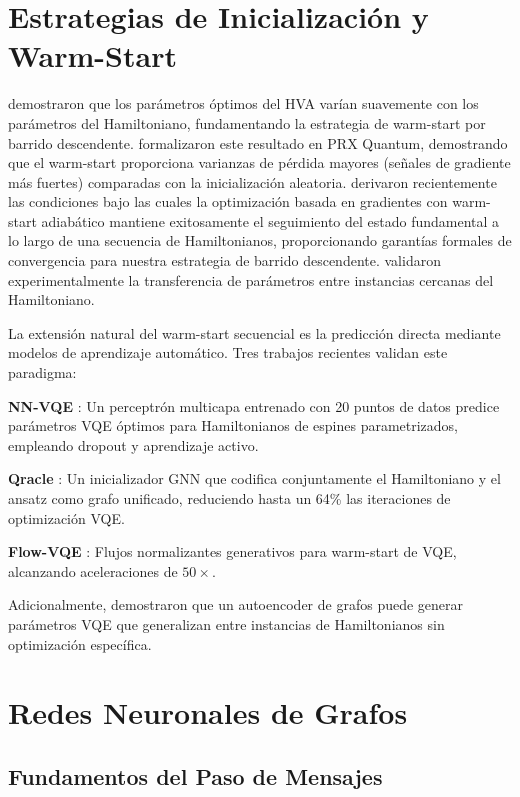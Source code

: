 \documentclass[11pt,a4paper,spanish]{book}
\begin{document}
\section{Estrategias de Inicialización y Warm-Start}

\citet{mele2022} demostraron que los parámetros óptimos del HVA varían suavemente con los parámetros del Hamiltoniano, fundamentando la estrategia de warm-start por barrido descendente. \citet{puig2025} formalizaron este resultado en PRX Quantum, demostrando que el warm-start proporciona varianzas de pérdida mayores (señales de gradiente más fuertes) comparadas con la inicialización aleatoria. \citet{schiffer2026} derivaron recientemente las condiciones bajo las cuales la optimización basada en gradientes con warm-start adiabático mantiene exitosamente el seguimiento del estado fundamental a lo largo de una secuencia de Hamiltonianos, proporcionando garantías formales de convergencia para nuestra estrategia de barrido descendente. \citet{skogh2023} validaron experimentalmente la transferencia de parámetros entre instancias cercanas del Hamiltoniano.

La extensión natural del warm-start secuencial es la predicción directa mediante modelos de aprendizaje automático. Tres trabajos recientes validan este paradigma:

\textbf{NN-VQE} \citep{miao2024}: Un perceptrón multicapa entrenado con 20 puntos de datos predice parámetros VQE óptimos para Hamiltonianos de espines parametrizados, empleando dropout y aprendizaje activo.

\textbf{Qracle} \citep{zhang2025}: Un inicializador GNN que codifica conjuntamente el Hamiltoniano y el ansatz como grafo unificado, reduciendo hasta un 64\% las iteraciones de optimización VQE.

\textbf{Flow-VQE} \citep{zou2026}: Flujos normalizantes generativos para warm-start de VQE, alcanzando aceleraciones de $50\times$.

Adicionalmente, \citet{lee2026} demostraron que un autoencoder de grafos puede generar parámetros VQE que generalizan entre instancias de Hamiltonianos sin optimización específica.

\section{Redes Neuronales de Grafos}

\subsection{Fundamentos del Paso de Mensajes}
\end{document}
